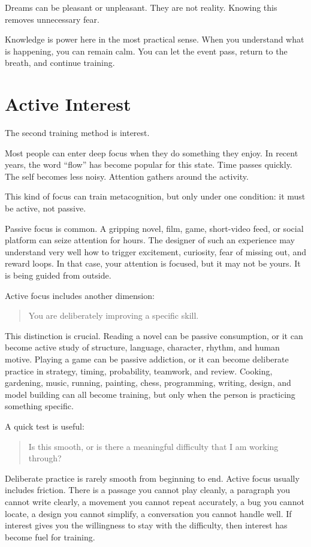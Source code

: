 Dreams can be pleasant or unpleasant. They are not reality. Knowing this removes unnecessary fear.

Knowledge is power here in the most practical sense. When you understand what is happening, you can remain calm. You can let the event pass, return to the breath, and continue training.

\section*{Active Interest}

The second training method is interest.

Most people can enter deep focus when they do something they enjoy. In recent years, the word ``flow'' has become popular for this state. Time passes quickly. The self becomes less noisy. Attention gathers around the activity.

This kind of focus can train metacognition, but only under one condition: it must be active, not passive.

Passive focus is common. A gripping novel, film, game, short-video feed, or social platform can seize attention for hours. The designer of such an experience may understand very well how to trigger excitement, curiosity, fear of missing out, and reward loops. In that case, your attention is focused, but it may not be yours. It is being guided from outside.

Active focus includes another dimension:

\begin{quote}
You are deliberately improving a specific skill.
\end{quote}

This distinction is crucial. Reading a novel can be passive consumption, or it can become active study of structure, language, character, rhythm, and human motive. Playing a game can be passive addiction, or it can become deliberate practice in strategy, timing, probability, teamwork, and review. Cooking, gardening, music, running, painting, chess, programming, writing, design, and model building can all become training, but only when the person is practicing something specific.

A quick test is useful:

\begin{quote}
Is this smooth, or is there a meaningful difficulty that I am working through?
\end{quote}

Deliberate practice is rarely smooth from beginning to end. Active focus usually includes friction. There is a passage you cannot play cleanly, a paragraph you cannot write clearly, a movement you cannot repeat accurately, a bug you cannot locate, a design you cannot simplify, a conversation you cannot handle well. If interest gives you the willingness to stay with the difficulty, then interest has become fuel for training.

